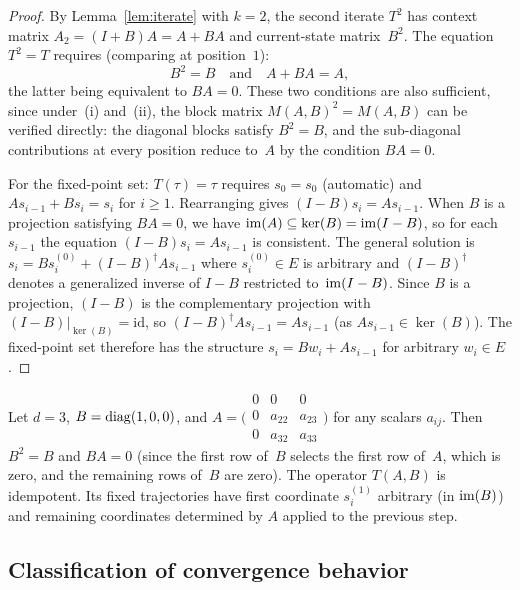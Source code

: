 \begin{proof}
  By Lemma~\ref{lem:iterate} with $k=2$, the second iterate $T^2$ has
  context matrix $A_2=(I+B)A=A+BA$ and current-state matrix~$B^2$.
  The equation $T^2=T$ requires (comparing at position~$1$):
  \[
    B^2=B \quad\text{and}\quad A+BA=A,
  \]
  the latter being equivalent to $BA=0$. These two conditions are also
  sufficient, since under~(i) and~(ii), the block matrix $M(A,B)^2=M(A,B)$
  can be verified directly: the diagonal blocks satisfy $B^2=B$, and the
  sub-diagonal contributions at every position reduce to~$A$ by the
  condition $BA=0$.

  For the fixed-point set: $T(\tau)=\tau$ requires $s_0=s_0$ (automatic) and
  $As_{i-1}+Bs_i=s_i$ for $i\geq 1$. Rearranging gives
  $(I-B)s_i=As_{i-1}$. When $B$ is a projection satisfying $BA=0$, we have
  $\operatorname{im}(A)\subseteq\ker(B)=\operatorname{im}(I-B)$, so for each $s_{i-1}$ the equation
  $(I-B)s_i=As_{i-1}$ is consistent. The general solution is
  $s_i=Bs_i^{(0)}+(I-B)^{\dagger}As_{i-1}$ where $s_i^{(0)}\in E$ is
  arbitrary and $(I-B)^{\dagger}$ denotes a generalized inverse of $I-B$
  restricted to~$\operatorname{im}(I-B)$. Since $B$ is a projection, $(I-B)$ is the
  complementary projection with $(I-B)|_{\ker(B)}=\mathrm{id}$, so
  $(I-B)^{\dagger}As_{i-1}=As_{i-1}$ (as $As_{i-1}\in\ker(B)$). The
  fixed-point set therefore has the structure
  $s_i=Bw_i+As_{i-1}$ for arbitrary $w_i\in E$.
\end{proof}

\begin{example}\label{ex:idempotent}
  Let $d=3$, $B=\operatorname{diag}(1,0,0)$, and $A=\bigl(\begin{smallmatrix}0&0&0\\
  0&a_{22}&a_{23}\\0&a_{32}&a_{33}\end{smallmatrix}\bigr)$ for any scalars
  $a_{ij}$. Then $B^2=B$ and $BA=0$ (since the first row of~$B$ selects the
  first row of~$A$, which is zero, and the remaining rows of~$B$ are zero).
  The operator $T(A,B)$ is idempotent. Its fixed trajectories have first
  coordinate $s_i^{(1)}$ arbitrary (in $\operatorname{im}(B)$) and remaining coordinates
  determined by $A$ applied to the previous step.
\end{example}

\subsection{Classification of convergence behavior}

